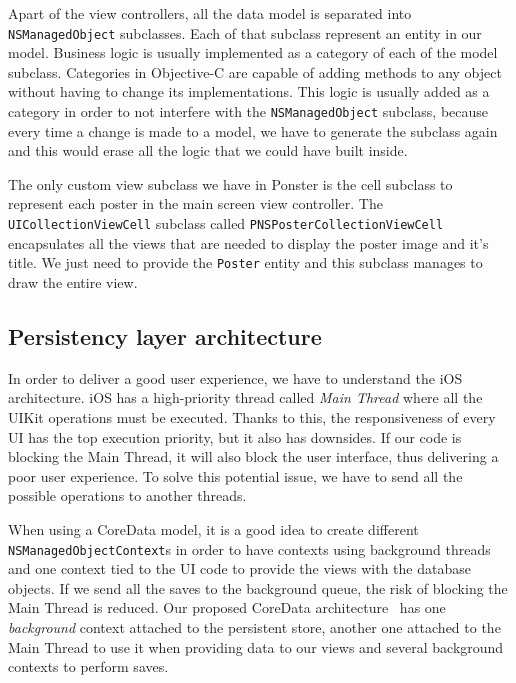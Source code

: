 Apart of the view controllers, all the data model is separated into
\texttt{NSManaged\-Object} subclasses. Each of that subclass represent an entity in
our model. Business logic is usually implemented as a category of each of the model
subclass. Categories in Objective-C are capable of adding methods to any object
without having to change its implementations. This logic is usually added as a
category in order to not interfere with the \texttt{NSManagedObject} subclass,
because every time a change is made to a model, we have to generate the subclass
again and this would erase all the logic that we could have built inside.

The only custom view subclass we have in Ponster is the cell subclass to
represent each poster in the main screen view controller. The
\texttt{UI\-Collection\-View\-Cell} subclass called \texttt{PNSPoster\-Collection\-View\-Cell}
encapsulates all the views that are needed to display the poster image and it's
title. We just need to provide the \texttt{Poster} entity and this subclass manages
to draw the entire view.

\subsection{Persistency layer architecture}
\label{sec:persistency}
In order to deliver a good user experience, we have to understand the iOS
architecture. iOS has a high-priority thread called \emph{Main Thread} where all the
UIKit operations must be executed. Thanks to this, the responsiveness of every UI
has the top execution priority, but it also has downsides. If our code is blocking
the Main Thread, it will also block the user interface, thus delivering a poor user
experience. To solve this potential issue, we have to send all the possible
operations to another threads.

When using a CoreData model, it is a good idea to create different
\texttt{NSManaged\-Object\-Context}s in order to have contexts using background threads
and one context tied to the UI code to provide the views with the database
objects. If we send all the saves to the background queue, the risk of blocking the
Main Thread is reduced. Our proposed CoreData architecture~\cite{coredataarch} has
one \emph{background} context attached to the persistent store, another one attached
to the Main Thread to use it when providing data to our views and several background
contexts to perform saves.

